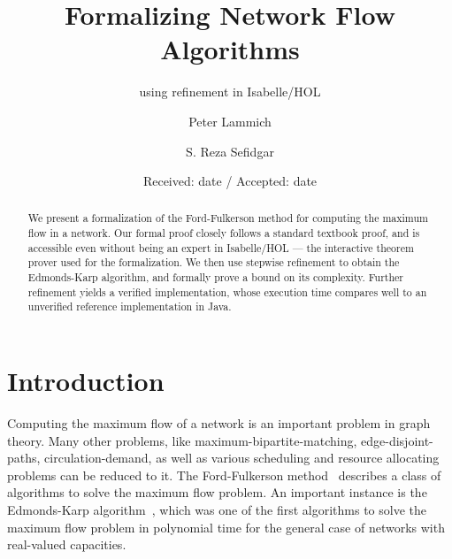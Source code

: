 \documentclass[smallcondensed]{svjour3}     %
\begin{document}
\title{Formalizing Network Flow Algorithms}
\subtitle{using refinement in Isabelle/HOL}


\author{
  Peter Lammich \and
  S. Reza Sefidgar 
}



\date{Received: date / Accepted: date}


\maketitle

\begin{abstract}
We present a formalization of the Ford-Fulkerson method for computing the maximum flow in a network.
Our formal proof closely follows a standard textbook proof, and is accessible even without being
an expert in Isabelle/HOL --- the interactive theorem prover used for the formalization.
We then use stepwise refinement to obtain the Edmonds-Karp algorithm, and formally prove a bound on its complexity.
Further refinement yields a verified implementation, whose execution time compares well to an unverified reference implementation in Java.
\end{abstract}










\section{Introduction}
Computing the maximum flow of a network is an important problem in graph theory.
Many other problems, like maximum-bipartite-matching, edge-disjoint-paths, circulation-demand, as well as various scheduling and resource allocating problems can be reduced to it.
The Ford-Fulkerson method~\cite{FF56} describes a class of algorithms to solve the maximum flow problem. An important instance is the Edmonds-Karp algorithm~\cite{EK72},
which was one of the first algorithms to solve the maximum flow problem in polynomial time for the general case of networks with real-valued capacities.
\end{document}
